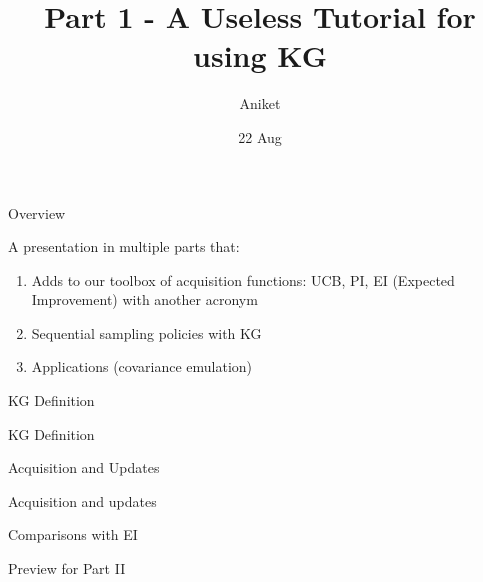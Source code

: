 \documentclass[usenames,dvipsnames]{beamer}
\title[Seminar]{Part 1 - A Useless Tutorial for using KG}
\author[AJ]{Aniket}
\institute[U-M]{University of Michigan}
\date{22 Aug}
\theoremstyle{definition}
\begin{document}
\begin{frame}
\titlepage %
\end{frame}


\begin{frame}{Overview}

A presentation in multiple parts that:

\begin{enumerate}
    \item Adds to our toolbox of acquisition functions: UCB, PI, EI (Expected Improvement) with another acronym
    
    \item Sequential sampling policies with KG
    
    \item Applications (covariance emulation)
\end{enumerate}

\end{frame}


\begin{frame}{KG Definition}

\end{frame}

\begin{frame}{KG Definition}
    
\end{frame}

\begin{frame}{Acquisition and Updates}
    
\end{frame}

\begin{frame}{Acquisition and updates}


\end{frame}

\begin{frame}{Comparisons with EI}
    
\end{frame}

\begin{frame}{Preview for Part II}

\end{frame}

\end{document}
